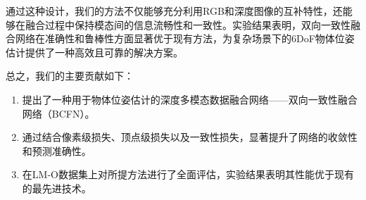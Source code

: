 通过这种设计，我们的方法不仅能够充分利用RGB和深度图像的互补特性，还能够在融合过程中保持模态间的信息流畅性和一致性。实验结果表明，双向一致性融合网络在准确性和鲁棒性方面显著优于现有方法，为复杂场景下的6DoF物体位姿估计提供了一种高效且可靠的解决方案。

总之，我们的主要贡献如下：
\begin{enumerate}
\item 提出了一种用于物体位姿估计的深度多模态数据融合网络——双向一致性融合网络（BCFN）。
\item 通过结合像素级损失、顶点级损失以及一致性损失，显著提升了网络的收敛性和预测准确性。
\item 在LM-O数据集上对所提方法进行了全面评估，实验结果表明其性能优于现有的最先进技术。
\end{enumerate}

